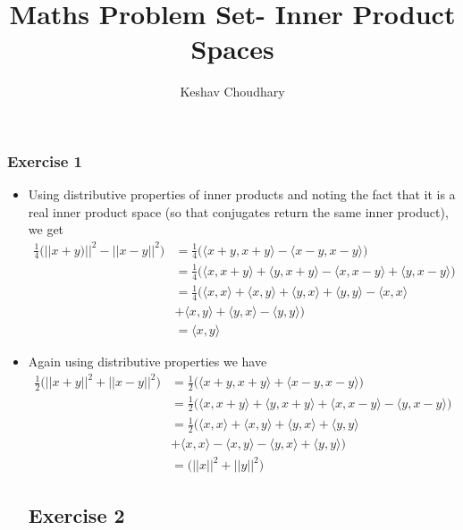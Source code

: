 \documentclass{article}
\title{Maths Problem Set- Inner Product Spaces}
\author{Keshav Choudhary}
\date{}
\begin{document}
  \maketitle

  \subsubsection*{Exercise 1}
  \begin{itemize}
     \item Using distributive properties of inner products and noting
     the fact that it is a real inner product space (so that conjugates return the same inner product), we get
     \begin{align*}
       \frac{1}{4} \bigg ({||x + y)||}^2 - {||x - y||}^2 \bigg) &= \frac{1}{4} \bigg ( \langle x + y, x+y \rangle - \langle x-y, x-y\rangle \bigg )\\
      &= \frac{1}{4} \bigg (\langle x , x+y \rangle + \langle y, x+y \rangle - \langle x, x-y\rangle + \langle y, x-y \rangle \bigg) \\
      &= \frac{1}{4} \bigg( \langle x,x \rangle + \langle x,y \rangle + \langle y,x \rangle + \langle y,y \rangle - \langle x,x \rangle\\
      &+ \langle x,y \rangle + \langle y,x \rangle - \langle y,y \rangle \bigg)\\
      &= \langle x,y \rangle
    \end{align*}
    \item Again using distributive properties we have
    \begin{align*}
      \frac{1}{2} \bigg( ||x+y||^2 + ||x-y||^2 \bigg) &= \frac{1}{2} \bigg( \langle x+y, x+y \rangle + \langle x-y, x-y \rangle \bigg)\\
      &= \frac{1}{2} \bigg( \langle x, x+y \rangle + \langle y, x+y \rangle + \langle x, x-y \rangle - \langle y, x-y \rangle \bigg)\\
      &= \frac{1}{2}\bigg(\langle x, x \rangle + \langle x, y \rangle + \langle y, x \rangle + \langle y, y \rangle \\
      &+ \langle x, x \rangle - \langle x, y \rangle - \langle y,x \rangle + \langle y,y \rangle \bigg)\\
      &= \bigg(||x||^2 + ||y||^2 \bigg)
    \end{align*}

  \subsection*{Exercise 2}
    

  \end{itemize}
\end{document}
